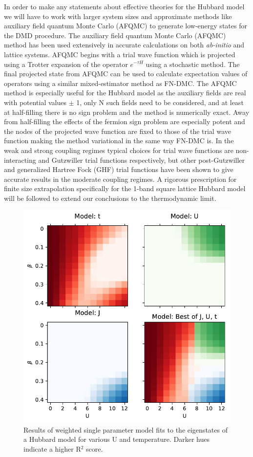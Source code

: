 \documentclass[12pt]{article}
\begin{document}
In order to make any statements about effective theories for the Hubbard model we will have to work with larger system sizes and approximate methods like auxiliary field quantum Monte Carlo (AFQMC) to generate low-energy states for the DMD procedure.
The auxiliary field quantum Monte Carlo (AFQMC) method has been used extensively in accurate calculations on both \textit{ab-initio} and lattice systems.
AFQMC begins with a trial wave function which is projected using a Trotter expansion of the operator $e^{-\tau H}$ using a stochastic method.
The final projected state from AFQMC can be used to calculate expectation values of operators using a similar mixed-estimator method as FN-DMC.
The AFQMC method is especially useful for the Hubbard model as the auxiliary fields are real with potential values $\pm$ 1, only N such fields need to be considered, and at least at half-filling there is no sign problem and the method is numerically exact. 
Away from half-filling the effects of the fermion sign problem are especially potent and the nodes of the projected wave function are fixed to those of the trial wave function making the method variational in the same way FN-DMC is.
In the weak and strong coupling regimes typical choices for trial wave functions are non-interacting and Gutzwiller trial functions respectively, but other post-Gutzwiller and generalized Hartree Fock (GHF) trial functions have been shown to give accurate results in the moderate coupling regimes.
A rigorous prescription for finite size extrapolation specifically for the 1-band square lattice Hubbard model will be followed to extend our conclusions to the thermodynamic limit.

\begin{figure}[H]
\centering
\includegraphics[width=0.6\linewidth]{figs/eff_eig_prelim.pdf}
\caption{Results of weighted single parameter model fits to the eigenstates of a Hubbard model for various U and temperature. Darker hues indicate a higher R$^2$ score.}
\label{fig:Hubbard}
\end{figure}	
\end{document}
